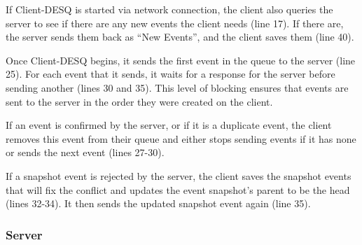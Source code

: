 If Client-DESQ is started via network connection, the client also queries the server to see if there are any new events the client needs (line 17). If there are, the server sends them back as ``New Events'', and the client saves them (line 40).

Once Client-DESQ begins, it sends the first event in the queue to the server (line 25). For each event that it sends, it waits for a response for the server before sending another (lines 30 and 35). This level of blocking ensures that events are sent to the server in the order they were created on the client.

If an event is confirmed by the server, or if it is a duplicate event, the client removes this event from their queue and either stops sending events if it has none or sends the next event (lines 27-30).

If a snapshot event is rejected by the server, the client saves the snapshot events that will fix the conflict and updates the event snapshot's parent to be the head (lines 32-34). It then sends the updated snapshot event again (line 35). 

\subsubsection{Server}

